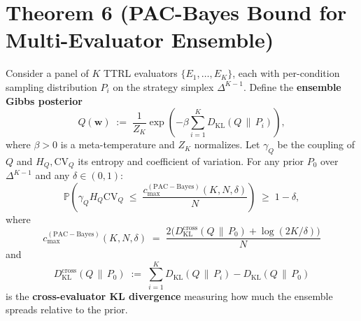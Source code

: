 %
%
%
%

\section*{Theorem 6 (PAC-Bayes Bound for Multi-Evaluator Ensemble)}

\begin{theorem}
\label{thm:T6}
Consider a panel of $K$ TTRL evaluators $\{E_1, \ldots, E_K\}$, each with
per-condition sampling distribution $P_i$ on the strategy simplex $\Delta^{K-1}$.
Define the \textbf{ensemble Gibbs posterior}
\[
  Q(\mathbf{w}) \;:=\; \frac{1}{Z_K} \exp\!\left(
    -\beta \sum_{i=1}^{K} D_{\mathrm{KL}}(Q \,\|\, P_i)
  \right),
\]
where $\beta > 0$ is a meta-temperature and $Z_K$ normalizes. Let $\gamma_Q$
be the coupling of $Q$ and $H_Q, \mathrm{CV}_Q$ its entropy and coefficient of
variation. For any prior $P_0$ over $\Delta^{K-1}$ and any $\delta \in (0,1)$:
\[
  \mathbb{P}\!\left(
    \gamma_Q H_Q \mathrm{CV}_Q
    \;\le\; \frac{c_{\max}^{(\mathrm{PAC-Bayes})}(K, N, \delta)}{N}
  \right) \;\ge\; 1 - \delta,
\]
where
\[
  c_{\max}^{(\mathrm{PAC-Bayes})}(K, N, \delta)
    \;=\; \frac{2 \bigl(D_{\mathrm{KL}}^{\mathrm{cross}}(Q \,\|\, P_0) + \log(2K/\delta)\bigr)}{N}
\]
and
\[
  D_{\mathrm{KL}}^{\mathrm{cross}}(Q \,\|\, P_0)
    \;:=\; \sum_{i=1}^K D_{\mathrm{KL}}(Q \,\|\, P_i) - D_{\mathrm{KL}}(Q \,\|\, P_0)
\]
is the \textbf{cross-evaluator KL divergence} measuring how much the ensemble
spreads relative to the prior.
\end{theorem}

